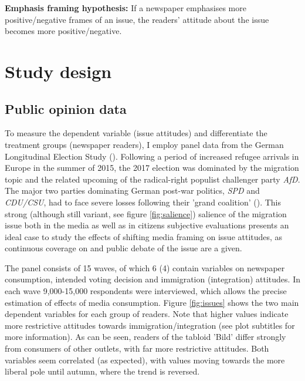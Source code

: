 \documentclass{article}
\begin{document}
\textbf{Emphasis framing hypothesis:} If a newspaper emphasises more positive/negative frames of an issue, the readers' attitude about the issue becomes more positive/negative.




\section{Study design}

\subsection{Public opinion data}

To measure the dependent variable (issue attitudes) and differentiate the treatment groups (newspaper readers), I employ panel data from the German Longitudinal Election Study (\cite{GLES2019LongTermTracking}). Following a period of increased refugee arrivals in Europe in the summer of 2015, the 2017 election was dominated by the migration topic and the related upcoming of the radical-right populist challenger party \textit{AfD}. The major two parties dominating German post-war politics, \textit{SPD} and \textit{CDU/CSU}, had to face severe losses following their 'grand coalition' (\cite{Bieber2021, Wessels2021}). This strong (although still variant, see figure \ref{fig:salience}) salience of the migration issue both in the media as well as in citizens subjective evaluations presents an ideal case to study the effects of shifting media framing on issue attitudes, as continuous coverage on and public debate of the issue are a given.

The panel consists of 15 waves, of which 6 (4) contain variables on newspaper consumption, intended voting decision and immigration (integration) attitudes. In each wave 9,000-15,000 respondents were interviewed, which allows the precise estimation of effects of media consumption. Figure \ref{fig:issues} shows the two main dependent variables for each group of readers. Note that higher values indicate more restrictive attitudes towards immigration/integration (see plot subtitles for more information). As can be seen, readers of the tabloid 'Bild' differ strongly from consumers of other outlets, with far more restrictive attitudes. Both variables seem correlated (as expected), with values moving towards the more liberal pole until autumn, where the trend is reversed.
\end{document}
